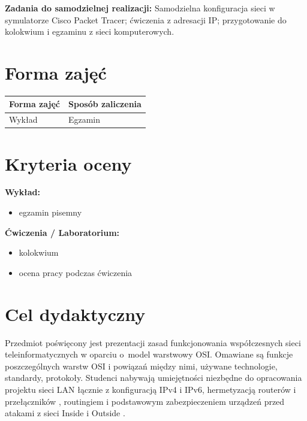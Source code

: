 \documentclass[12pt, a4paper]{article}
\newcommand{\thdrule}{\noalign{\global\setlength{\extrarowheight}{0pt}}}
\newcommand{\thdend}{\noalign{\global\setlength{\extrarowheight}{3pt}}}
\begin{document}
\vspace{4pt}
\noindent\textbf{Zadania do samodzielnej realizacji:} Samodzielna konfiguracja sieci w symulatorze Cisco Packet Tracer; ćwiczenia z adresacji IP; przygotowanie do kolokwium i egzaminu z sieci komputerowych.

\section{Forma zajęć}

\begin{center}
{\scriptsize
\begin{tabular}{m{5cm}m{8cm}}
\thdrule\toprule
\rowcolor{pjatkRed} {\color{white}\textbf{Forma zajęć}} & {\color{white}\textbf{Sposób zaliczenia}} \\
\midrule\thdend
  \rowcolor{tableRowLight} Wykład & Egzamin \\
\bottomrule
\end{tabular}}
\end{center}

\section{Kryteria oceny}

\textbf{Wykład:}
\begin{itemize}
  \item egzamin pisemny
\end{itemize}
\vspace{4pt}
\textbf{Ćwiczenia / Laboratorium:}
\begin{itemize}
  \item kolokwium
  \item ocena pracy podczas ćwiczenia
\end{itemize}


\section{Cel dydaktyczny}

Przedmiot poświęcony jest prezentacji zasad funkcjonowania  współczesnych sieci teleinformatycznych w oparciu o model warstwowy OSI. Omawiane są funkcje poszczególnych  warstw OSI i powiązań między nimi, używane technologie, standardy, protokoły. Studenci nabywają umiejętności niezbędne do opracowania  projektu sieci LAN  łącznie z konfiguracją IPv4 i IPv6, hermetyzacją  routerów i przełączników ,  routingiem i podstawowym zabezpieczeniem urządzeń przed atakami z  sieci Inside  i Outside .
\end{document}
